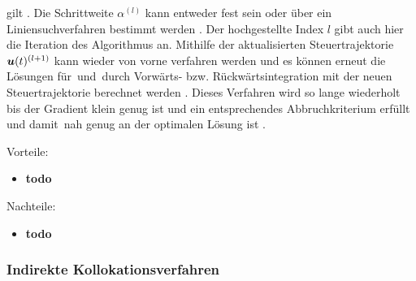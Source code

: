 gilt \cite{KnutGraichen.2012}. Die Schrittweite $\alpha^{(l)}$ kann entweder fest sein oder über ein Liniensuchverfahren bestimmt werden \cite{KnutGraichen.2012}. Der hochgestellte Index $l$ gibt auch hier die Iteration des Algorithmus an. Mithilfe der aktualisierten Steuertrajektorie $\boldsymbol{u}(t)^{(l+1)}$ kann wieder von vorne verfahren werden und es können erneut die Lösungen für \xoft\,und \lambdaoft\,durch Vorwärts- bzw. Rückwärtsintegration mit der neuen Steuertrajektorie berechnet werden \cite{Papageorgiou.2012}. Dieses Verfahren wird so lange wiederholt bis der Gradient klein genug ist und ein entsprechendes Abbruchkriterium erfüllt und damit \uoft\,nah genug an der optimalen Lösung ist \cite{Papageorgiou.2012}.
\begin{multicols}{2}
	Vorteile:
	\begin{itemize}
		\item \textbf{todo}
	\end{itemize}
	
	\columnbreak
	
	Nachteile:
	\begin{itemize}
				\item \textbf{todo}
	\end{itemize}
\end{multicols}
\subsubsection{Indirekte Kollokationsverfahren}\label{subsubsec:Kollokationsverfahren_indirekt}

